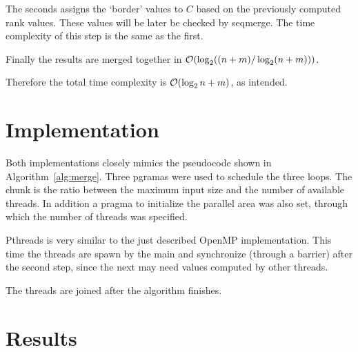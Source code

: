 The seconds assigns the `border' values to $C$ based on the previously computed rank values. These values will be later be checked by seqmerge. The time complexity of this step is the same as the first.

Finally the results are merged together in $\mathcal{O}(\log_2 ((n+m)/\log_2(n+m)))$.

Therefore the total time complexity is $\mathcal{O}(\log_2{ n+m})$, as intended.

\section{Implementation}

Both implementations closely mimics the pseudocode shown in Algorithm~\ref{alg:merge}.
Three pgramas were used to schedule the three loops. The chunk is the ratio between the maximum input size and the number of available threads. In addition a pragma to initialize the parallel area was also set, through which the number of threads was specified.

Pthreads is very similar to the just described OpenMP implementation. This time the threads are spawn by the main and synchronize (through a barrier) after the second step, since the next may need values computed by other threads.

The threads are joined after the algorithm finishes.

\section{Results}
\label{sec:results}


